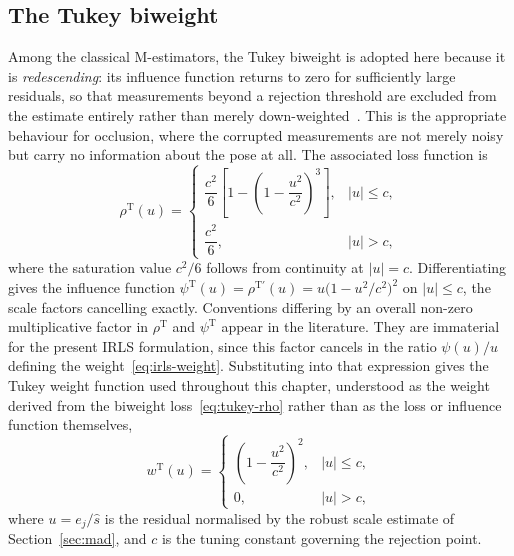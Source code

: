 \subsection{The Tukey biweight}
\label{sec:tukey-biweight}

Among the classical M-estimators, the Tukey biweight is adopted here because
it is \emph{redescending}: its influence function returns to zero for
sufficiently large residuals, so that measurements beyond a rejection
threshold are excluded from the estimate entirely rather than merely
down-weighted~\cite{key51}. This is the appropriate behaviour for occlusion,
where the corrupted measurements are not merely noisy but carry no information
about the pose at all. The associated loss function is
\begin{equation}
    \rho^{\mathrm{T}}(u)=
    \begin{cases}
        \dfrac{c^{2}}{6}\left[1-\left(1-\dfrac{u^{2}}{c^{2}}\right)^{3}\right],
            & \lvert u\rvert\le c,\\[10pt]
        \dfrac{c^{2}}{6}, & \lvert u\rvert>c,
    \end{cases}
    \label{eq:tukey-rho}
\end{equation}
where the saturation value $c^{2}/6$ follows from continuity at
$\lvert u\rvert=c$. Differentiating gives the influence function
$\psi^{\mathrm{T}}(u)=\rho^{\mathrm{T}\prime}(u)=u\bigl(1-u^{2}/c^{2}\bigr)^{2}$
on $\lvert u\rvert\le c$, the scale factors cancelling exactly. Conventions
differing by an overall non-zero multiplicative factor in $\rho^{\mathrm{T}}$
and $\psi^{\mathrm{T}}$ appear in the literature. They are immaterial for the
present IRLS formulation, since this factor cancels in the ratio $\psi(u)/u$
defining the weight~\eqref{eq:irls-weight}. Substituting into that expression
gives the Tukey weight function used throughout this chapter, understood as
the weight derived from the biweight loss~\eqref{eq:tukey-rho} rather than as
the loss or influence function themselves,
\begin{equation}
    w^{\mathrm{T}}(u)=
    \begin{cases}
        \left(1-\dfrac{u^{2}}{c^{2}}\right)^{2}, & \lvert u\rvert\le c,\\[10pt]
        0, & \lvert u\rvert>c,
    \end{cases}
    \label{eq:tukey}
\end{equation}
where $u=e_{j}/\hat{s}$ is the residual normalised by the robust scale
estimate of Section~\ref{sec:mad}, and $c$ is the tuning constant governing
the rejection point.

